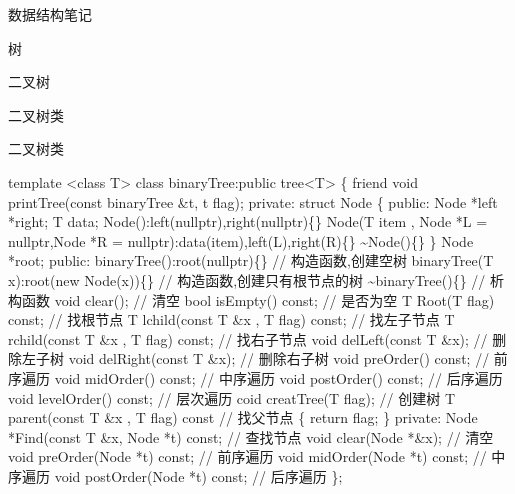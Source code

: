 \documentclass[
  ignorenonframetext,
]{beamer}
\newenvironment{Shaded}{}{}
\newcommand{\NormalTok}[1]{#1}
\begin{document}
\begin{frame}[fragile]{数据结构笔记}
\begin{block}{树}
\begin{block}{二叉树}
\begin{block}{二叉树类}
\begin{block}{二叉树类}
\protect{}\label{ux4e8cux53c9ux6811ux7c7b-1}
\begin{Shaded}
\begin{Highlighting}[]
\NormalTok{template \textless{}class T\textgreater{}}
\NormalTok{class binaryTree:public tree\textless{}T\textgreater{}}
\NormalTok{\{}
\NormalTok{    friend void printTree(const binaryTree \&t, t flag);}
\NormalTok{  private:}
\NormalTok{    struct Node}
\NormalTok{    \{}
\NormalTok{      public:}
\NormalTok{        Node *left *right;}
\NormalTok{        T data;}
\NormalTok{        Node():left(nullptr),right(nullptr)\{\}}
\NormalTok{        Node(T item , Node *L = nullptr,Node *R = nullptr):data(item),left(L),right(R)\{\}}
\NormalTok{        \textasciitilde{}Node()\{\}}
\NormalTok{    \}}
\NormalTok{    Node *root;}
\NormalTok{  public:}
\NormalTok{    binaryTree():root(nullptr)\{\}                    // 构造函数,创建空树}
\NormalTok{    binaryTree(T x):root(new Node(x))\{\}             // 构造函数,创建只有根节点的树}
\NormalTok{    \textasciitilde{}binaryTree()\{\}                                 // 析构函数}
\NormalTok{    void clear();                                   // 清空}
\NormalTok{    bool isEmpty() const;                           // 是否为空}
\NormalTok{    T Root(T flag) const;                           // 找根节点}
\NormalTok{    T lchild(const T \&x , T flag) const;            // 找左子节点}
\NormalTok{    T rchild(const T \&x , T flag) const;            // 找右子节点}
\NormalTok{    void delLeft(const T \&x);                       // 删除左子树}
\NormalTok{    void delRight(const T \&x);                      // 删除右子树}
\NormalTok{    void preOrder() const;                          // 前序遍历}
\NormalTok{    void midOrder() const;                          // 中序遍历}
\NormalTok{    void postOrder() const;                         // 后序遍历}
\NormalTok{    void levelOrder() const;                        // 层次遍历}
\NormalTok{    coid creatTree(T flag);                         // 创建树}
\NormalTok{    T parent(const T \&x , T flag) const             // 找父节点}
\NormalTok{    \{}
\NormalTok{      return flag;}
\NormalTok{    \}}
\NormalTok{  private:}
\NormalTok{    Node *Find(const T \&x, Node *t) const;            // 查找节点}
\NormalTok{    void clear(Node *\&x);                             // 清空}
\NormalTok{    void preOrder(Node *t) const;                     // 前序遍历}
\NormalTok{    void midOrder(Node *t) const;                     // 中序遍历}
\NormalTok{    void postOrder(Node *t) const;                    // 后序遍历}
\NormalTok{\};}
\end{Highlighting}
\end{Shaded}
\end{block}


\end{block}
\end{block}
\end{block}
\end{frame}
\end{document}
